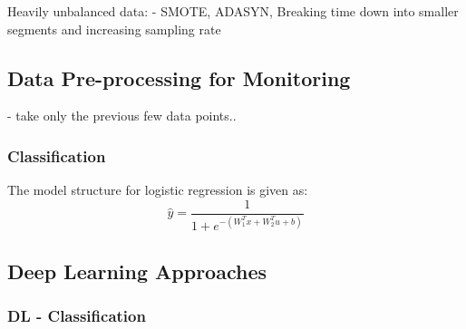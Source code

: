 %
% 

Heavily unbalanced data:
- SMOTE, ADASYN, Breaking time down into smaller segments and increasing sampling rate

\subsection{Data Pre-processing for Monitoring}
- take only the previous few data points..

\subsubsection{Classification}
The model structure for logistic regression is given as:
\begin{equation}
    \hat{y} = \frac{1}{1 + e^{-(W_1^Tx + W_2^Tu + b)}}
    \label{eq:02LogS}
\end{equation}

\subsection{Deep Learning Approaches}
\subsubsection{DL - Classification}

